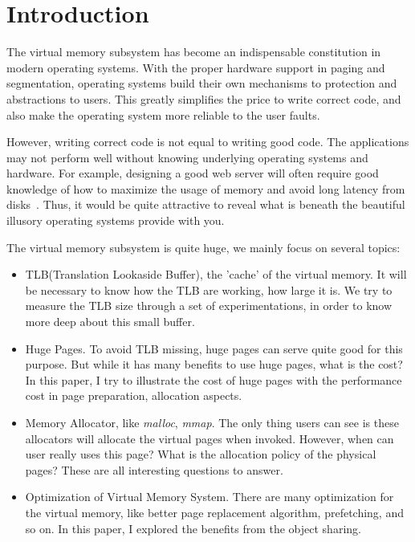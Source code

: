 \section{Introduction}
    \label{sec:intro}
	
The virtual memory subsystem has become an indispensable constitution in modern
operating systems. With the proper hardware support in paging and segmentation,
operating systems build their own mechanisms to protection and abstractions to
users. This greatly simplifies the price to write correct code, and also make
the operating system more reliable to the user faults.

However, writing correct code is not equal to writing good code. The
applications may not perform well without knowing underlying operating systems
and hardware. For example, designing a good web server will often require good
knowledge of how to maximize the usage of memory and avoid long latency from
disks~\cite{c10k}. Thus, it would be quite attractive to reveal what is beneath
the beautiful illusory operating systems provide with you.

The virtual memory subsystem is quite huge, we mainly focus on several topics:
\begin{itemize}
\item TLB(Translation Lookaside Buffer), the 'cache' of the virtual memory. It
will be necessary to know how the TLB are working, how large it is. We try to
measure the TLB size through a set of experimentations, in order to know more
deep about this small buffer.
\item Huge Pages. To avoid TLB missing, huge pages can serve quite good for
this purpose. But while it has many benefits to use huge pages, what is the
cost? In this paper, I try to illustrate the cost of huge pages with the 
performance cost in page preparation, allocation aspects.
\item Memory Allocator, like \emph{malloc}, \emph{mmap}. The only thing users
can see is these allocators will allocate the virtual pages when invoked. However,
when can user really uses this page? What is the allocation policy of the physical
pages? These are all interesting questions to answer.
\item Optimization of Virtual Memory System. There are many optimization for the 
virtual memory, like better page replacement algorithm, prefetching, and so on. In
this paper, I explored the benefits from the object sharing.
\end{itemize}

